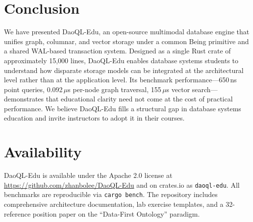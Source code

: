 \documentclass[11pt,a4paper]{article}
\begin{document}
\section{Conclusion}

We have presented DaoQL-Edu, an open-source multimodal database engine that
unifies graph, columnar, and vector storage under a common Being primitive
and a shared WAL-based transaction system. Designed as a single Rust crate
of approximately 15,000 lines, DaoQL-Edu enables database systems students
to understand how disparate storage models can be integrated at the
architectural level rather than at the application level. Its benchmark
performance---650\,ns point queries, 0.092\,$\mu$s per-node graph traversal,
155\,$\mu$s vector search---demonstrates that educational clarity need not
come at the cost of practical performance. We believe DaoQL-Edu fills a
structural gap in database systems education and invite instructors to
adopt it in their courses.

\section*{Availability}

DaoQL-Edu is available under the Apache 2.0 license at
\url{https://github.com/zhanbolee/DaoQL-Edu} and on crates.io as
\texttt{daoql-edu}. All benchmarks are reproducible via
\texttt{cargo bench}. The repository includes comprehensive architecture
documentation, lab exercise templates, and a 32-reference position paper
on the ``Data-First Ontology'' paradigm.
\end{document}
